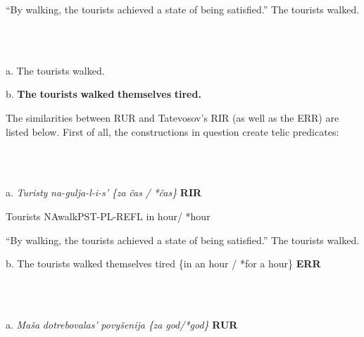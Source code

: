 \documentclass[output=paper,modfonts, nonflat]{langsci/langscibook}
\begin{document}
\begin{styleinnerExample}
    “By walking, the tourists achieved a state of being satisfied.” The tourists walked. 
\end{styleinnerExample}

\begin{styleinnerExample}
\ea%
    \label{ex:key:36}
    \gll\\
        \\
    \glt
    \z

          a.   The tourists walked.
\end{styleinnerExample}

\begin{styleinnerExample}
  b.   \textbf{The} \textbf{tourists} \textbf{walked} \textbf{themselves} \textbf{tired.} 
\end{styleinnerExample}

The similarities between RUR and Tatevosov’s RIR (as well as the ERR) are listed below. First of all, the constructions in question create telic predicates:\\

\begin{styleinnerExample}
\ea%
    \label{ex:key:37}
    \gll\\
        \\
    \glt
    \z

          a.  \textit{Turisty} \textit{na-gulja-l-i-s’}                 \textit{\{za} \textit{čas} \textit{/} \textit{*čas\}}   \textbf{RIR}
\end{styleinnerExample}

\begin{styleinnerExample}
  Tourists      NAwalkPST-PL-REFL in hour/ *hour
\end{styleinnerExample}

\begin{styleinnerExample}
  “By walking, the tourists achieved a state of being satisfied.” The tourists walked. 
\end{styleinnerExample}

\begin{styleinnerExample}
  b.  The tourists walked themselves tired \{in an hour / *for a hour\} \textbf{ERR}
\end{styleinnerExample}

\begin{styleinnerExample}
\ea%
    \label{ex:key:38}
    \gll\\
        \\
    \glt
    \z

           a.  \textit{Maša}   \textit{dotrebovalas’}          \textit{povyšenija}        \textit{\{za} \textit{god/*god\}} \textbf{RUR}
\end{styleinnerExample}
\end{document}
